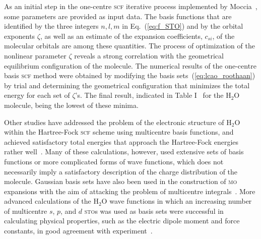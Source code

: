  
As an initial step in the one-centre \textsc{scf} iterative process
implemented by
Moccia~\cite{Moccia_JCP_2164,Moccia_JCP_2176,Moccia_1964}, some
parameters are provided as input data. The basis functions that are
identified by the three integers $n,l,m$ in Eq.~(\ref{eq:f_STO}) and
by the orbital exponents $\zeta$, as well as an estimate of the
expansion coefficients, $c_{si}$, of the molecular orbitals are among
these quantities. The process of optimization of the nonlinear
parameter $\zeta$ reveals a strong correlation with the geometrical
equilibrium configuration of the molecule. The numerical results of
the one-centre basis \textsc{scf} method were obtained by modifying
the basis sets~(\ref{eq:lcao_roothaan}) by trial and determining the
geometrical configuration that minimizes the total energy for each set
of $\zeta$'s. The final result, indicated in Table
I~\cite{Moccia_1964} for the H$_{2}$O molecule, being the lowest of
these minima.







Other studies have addressed the problem of the electronic structure
of H$_{2}$O within the Hartree-Fock \textsc{scf} scheme using
multicentre basis functions, and achieved satisfactory total energies
that approach the Hartree-Fock energies rather
well~\cite{natureH2O_1960, gaussianH2O_1965,
  Moccia_oneCenterHF_1967,Reeves_nature_1956}. Many of these
calculations, however, used extensive sets of basis functions or more
complicated forms of wave functions, which does not necessarily imply
a satisfactory description of the charge distribution of the
molecule. Gaussian basis sets have also been used in the construction
of \textsc{mo} expansions with the aim of attacking the problem of
multicentre
integrals~\cite{gaussianH2O_1965,Neumann_gaussian_1968}. More advanced
calculations of the H$_{2}$O wave functions in which an increasing
number of multicentre $s$, $p$, and $d$ \textsc{sto}s was used as
basis sets were successful in calculating physical properties, such as
the electric dipole moment and force constants, in good agreement with
experiment~\cite{Pitzer_1968,Pitzer_1970}.











